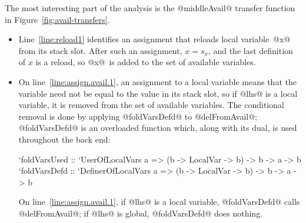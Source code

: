 \documentclass[blockstyle,preprint,natbib,nocopyrightspace]{sigplanconf}
\newcommand\lineref[1]{line~\ref{line:#1}}
\newcommand\Lineref[1]{Line~\ref{line:#1}}
\newcommand\slotof[1]{\ensuremath{s_{#1}}}
\def\finalremark#1{\relax}
\newcommand\figref[1]{Figure~\ref{fig:#1}}
\begin{document}
The most interesting part of the analysis is the @middleAvail@ transfer
function in \figref{avail-transfers}.\finalremark
{Let us revise the paper to pretend that global variables
don't exist.}
\begin{itemize}
\item
\Lineref{reload1} 
identifies an assignment that reloads local
variable~@x@ from its stack slot.\finalremark{I propose the compiler be
modified to use @isStackSlotOf@ as I've written. JD~approves.}
After such an assignment, $x = \slotof x$,
and the last definition of $x$ is a reload,
so @x@~is added to the set of available variables.
\item
On \lineref{assign.avail.1},
an assignment to a local variable means that the
variable need not be equal to the value in its stack
slot, so if @lhs@ is a local variable, it is removed from the set of
available variables.
The conditional removal is done by applying @foldVarsDefd@ to @delFromAvail@;
@foldVarsDefd@ is an overloaded function which, along with its dual,
is used throughout the back end:
\begin{code}
`foldVarsUsed :: `UserOfLocalVars a 
        => (b -> LocalVar -> b) -> b -> a -> b
`foldVarsDefd :: `DefinerOfLocalVars a 
        => (b -> LocalVar -> b) -> b -> a -> b
\end{code}
On \lineref{assign.avail.1},  if @lhs@ is a local variable,
@foldVarsDefd@ calls @delFromAvail@;
if @lhs@ is global, @foldVarsDefd@ does nothing.




\end{itemize}
\end{document}
